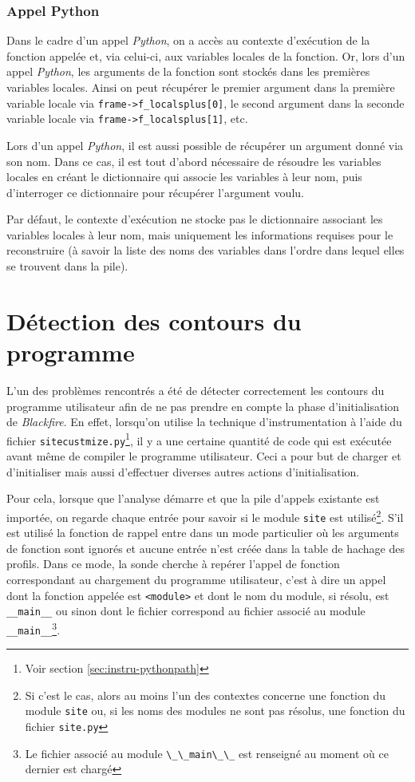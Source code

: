 \subsubsection*{Appel Python}
Dans le cadre d'un appel \emph{Python}, on a accès au contexte d'exécution de la fonction appelée et, via celui-ci, aux variables locales de la fonction. Or, lors d'un appel \emph{Python}, les arguments de la fonction sont stockés dans les premières variables locales. Ainsi on peut récupérer le premier argument dans la première variable locale via \verb|frame->f_localsplus[0]|, le second argument dans la seconde variable locale via \verb|frame->f_localsplus[1]|, etc.

Lors d'un appel \emph{Python}, il est aussi possible de récupérer un argument donné via son nom. Dans ce cas, il est tout d'abord nécessaire de résoudre les variables locales en créant le dictionnaire qui associe les variables à leur nom, puis d'interroger ce dictionnaire pour récupérer l'argument voulu.

\begin{note}
Par défaut, le contexte d'exécution ne stocke pas le dictionnaire associant les variables locales à leur nom, mais uniquement les informations requises pour le reconstruire (à savoir la liste des noms des variables dans l'ordre dans lequel elles se trouvent dans la pile).
\end{note}

  \section{Détection des contours du programme}

L'un des problèmes rencontrés a été de détecter correctement les contours du \gls{programme utilisateur} afin de ne pas prendre en compte la phase d'initialisation de \emph{Blackfire}. En effet, lorsqu'on utilise la technique d'instrumentation à l'aide du fichier \verb|sitecustmize.py|\footnote{Voir section \vref{sec:instru-pythonpath}}, il y a une certaine quantité de code qui est exécutée avant même de compiler le programme utilisateur. Ceci a pour but de charger et d'initialiser \Blackfire mais aussi d'effectuer diverses autres actions d'initialisation.

Pour cela, lorsque que l'analyse démarre et que la \gls{pile d'appels} existante est importée, on regarde chaque entrée pour savoir si le module \verb|site| est utilisé\footnote{Si c'est le cas, alors au moins l'un des contextes concerne une fonction du module \verb?site? ou, si les noms des modules ne sont pas résolus, une fonction du fichier \verb?site.py?}. S'il est utilisé la fonction de rappel entre dans un mode particulier où les arguments de fonction sont ignorés et aucune entrée n'est créée dans la table de hachage des profils. Dans ce mode, la sonde cherche à repérer l'appel de fonction correspondant au chargement du programme utilisateur, c'est à dire un appel dont la fonction appelée est \verb|<module>| et dont le nom du module, si résolu, est \verb|__main__| ou sinon dont le fichier correspond au fichier associé au module \verb|__main__|\footnote{Le fichier associé au module \verb?\_\_main\_\_? est renseigné au moment où ce dernier est chargé}.

